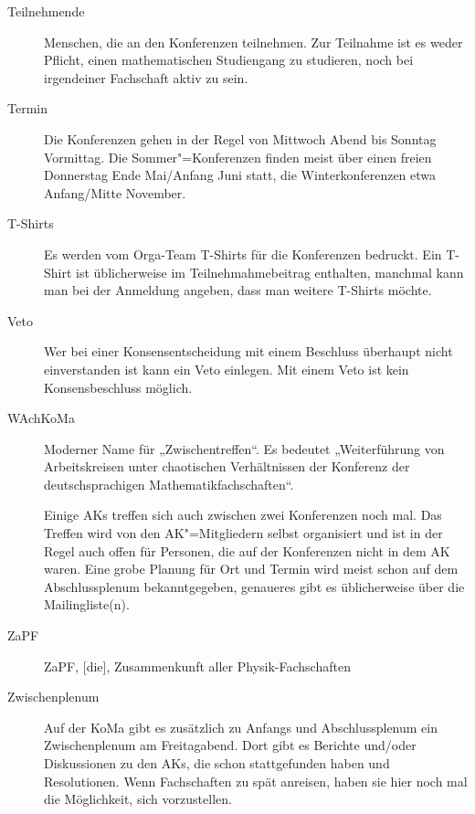 \begin{description}
\item[Teilnehmende]
    Menschen, die an den Konferenzen teilnehmen. Zur Teilnahme ist es weder Pflicht, einen mathematischen Studiengang zu studieren, noch bei irgendeiner Fachschaft aktiv zu sein.

\item[Termin]
    Die Konferenzen gehen in der Regel von Mittwoch Abend bis Sonntag Vormittag. Die Sommer"=Konferenzen finden meist über einen freien Donnerstag Ende Mai/Anfang Juni statt, die Winterkonferenzen etwa Anfang/Mitte November.

\item[T-Shirts]
    Es werden vom Orga-Team T-Shirts für die Konferenzen bedruckt. Ein T-Shirt ist üblicherweise im Teilnehmahmebeitrag enthalten, manchmal kann man bei der Anmeldung angeben, dass man weitere T-Shirts möchte.

\item[Veto]
    Wer bei einer Konsensentscheidung mit einem Beschluss überhaupt nicht einverstanden ist kann ein Veto einlegen. Mit einem Veto ist kein Konsensbeschluss möglich.

\item[WAchKoMa]
    Moderner Name für „Zwischentreffen“. Es bedeutet „Wei\-ter\-füh\-rung	von Arbeitskreisen unter chaotischen Verhältnissen der Konferenz der deutschsprachigen Mathematikfachschaften“.
    
    Einige AKs treffen sich auch zwischen zwei Konferenzen noch mal. Das Treffen wird von den AK"=Mitgliedern selbst organisiert und ist in der Regel auch offen für Personen, die auf der Konferenzen nicht in dem AK waren.  Eine grobe Planung für Ort und Termin wird meist schon auf dem Abschlussplenum bekanntgegeben, genaueres gibt es üblicherweise über die Mailingliste(n).

\item[ZaPF]
    ZaPF, [die], Zusammenkunft aller Physik-Fachschaften

\item[Zwischenplenum]
    Auf der KoMa gibt es zusätzlich zu Anfangs und Abschlussplenum ein Zwischenplenum am Freitagabend.  Dort gibt es Berichte und/oder Diskussionen zu den AKs, die schon stattgefunden haben und Resolutionen. Wenn Fachschaften zu spät anreisen, haben sie hier noch mal die Möglichkeit, sich vorzustellen.
\end{description}
